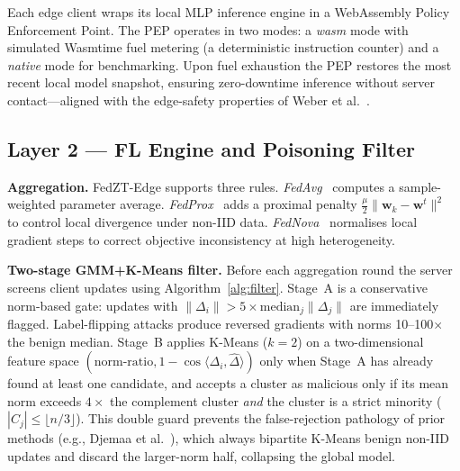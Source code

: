\documentclass[11pt,a4paper,twocolumn]{article}
\theoremstyle{definition}
\begin{document}
Each edge client wraps its local MLP inference engine in a WebAssembly
Policy Enforcement Point.  The PEP operates in two modes: a \textit{wasm}
mode with simulated Wasmtime fuel metering (a deterministic instruction
counter) and a \textit{native} mode for benchmarking.  Upon fuel exhaustion
the PEP restores the most recent local model snapshot, ensuring
zero-downtime inference without server contact---aligned with the edge-safety
properties of Weber et al.~\cite{weber2026}.

\subsection{Layer 2 — FL Engine and Poisoning Filter}
\label{sec:layer2}

\textbf{Aggregation.}
FedZT-Edge supports three rules.  \textit{FedAvg}~\cite{mcmahan2017}
computes a sample-weighted parameter average.  \textit{FedProx}~\cite{li2020fedprox}
adds a proximal penalty $\tfrac{\mu}{2}\|\mathbf{w}_k-\mathbf{w}^t\|^2$ to
control local divergence under non-IID data.  \textit{FedNova}~\cite{wang2020fednova}
normalises local gradient steps to correct objective inconsistency at high
heterogeneity.

\textbf{Two-stage GMM+K-Means filter.}
Before each aggregation round the server screens client updates using
Algorithm~\ref{alg:filter}.  Stage~A is a conservative norm-based gate:
updates with $\|\Delta_i\| > 5\times\text{median}_j\|\Delta_j\|$ are
immediately flagged.  Label-flipping attacks produce reversed gradients
with norms 10--100$\times$ the benign median.  Stage~B applies K-Means
($k=2$) on a two-dimensional feature space $(\text{norm-ratio},
1-\cos\langle\Delta_i,\hat\Delta\rangle)$ only when Stage~A has already
found at least one candidate, and accepts a cluster as malicious only if
its mean norm exceeds $4\times$ the complement cluster \emph{and} the
cluster is a strict minority ($|C_j|\le\lfloor n/3\rfloor$).  This
double guard prevents the false-rejection pathology of prior methods
(e.g., Djemaa et al.~\cite{djemaa2026}), which always bipartite K-Means
benign non-IID updates and discard the larger-norm half, collapsing the
global model.
\end{document}
